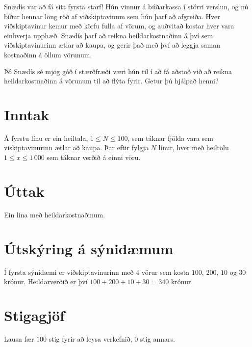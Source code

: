 
Snædís var að fá sitt fyrsta starf! Hún vinnur á búðarkassa í stórri
verslun, og nú bíður hennar löng röð af viðskiptavinum sem hún þarf að
afgreiða. Hver viðskiptavinur kemur með körfu fulla af vörum, og auðvitað
kostar hver vara einhverja upphæð. Snædís þarf að reikna heildarkostnaðinn á
því sem viðskiptavinurinn ætlar að kaupa, og gerir það með því að leggja saman
kostnaðinn á öllum vörunum.

Þó Snædís sé mjög góð í stærðfræði væri hún til í að fá aðstoð við að reikna
heildarkostnaðinn á vörunum til að flýta fyrir. Getur þú hjálpað henni?

\section*{Inntak}
Á fyrstu línu er ein heiltala, $1 \leq N\leq 100$, sem táknar fjölda vara sem
viskiptavinurinn ætlar að kaupa. Þar eftir fylgja $N$ línur, hver með heiltölu
$1\leq x \leq 1\,000$ sem táknar verðið á einni vöru.

\section*{Úttak}
Ein lína með heildarkostnaðinum.

\section*{Útskýring á sýnidæmum}
Í fyrsta sýnidæmi er viðskiptavinurinn með $4$ vörur sem kosta $100$, $200$,
$10$ og $30$ krónur. Heildarverðið er því $100 + 200 + 10 + 30 = 340$ krónur.

\section*{Stigagjöf}
Lausn fær $100$ stig fyrir að leysa verkefnið, $0$ stig annars.
